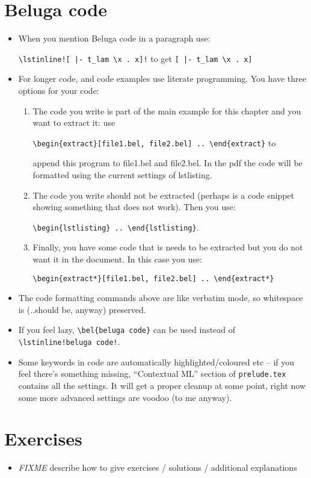 \documentclass[12pt]{article}
\begin{document}
\section{Beluga code}
\begin{itemize}
\item When you mention Beluga code in a paragraph use:

  \verb#\lstinline![ |- t_lam \x . x]!# to get \lstinline![ |- t_lam \x . x]!
\item For longer code, and code examples use literate programming. You have three options for your code:
  \begin{enumerate}
  \item The code you write is part of the main example for this
    chapter and you want to extract it: use

    \verb#\begin{extract}[file1.bel, file2.bel] .. \end{extract}# to

    append this program to file1.bel and file2.bel. In the pdf the
    code will be formatted using the current settings of lstlisting.
  \item The code you write should not be extracted (perhaps is a code
    snippet showing something that does not work). Then you use:

    \verb#\begin{lstlisting} .. \end{lstlisting}#.
  \item Finally, you have some code that is needs to be extracted but
    you do not want it in the document. In this case you use:

    \verb#\begin{extract*}[file1.bel, file2.bel] .. \end{extract*}#
  \end{enumerate}
\item The code formatting commands above are like verbatim mode, so whitespace is (..should be, anyway) preserved.
\item If you feel lazy, \verb#\bel{beluga code}# can be used instead of \\
  \verb#\lstinline!beluga code!#.
\item Some keywords in \beluga code are automatically highlighted/coloured etc -- if you feel there's something missing, ``Contextual ML'' section of \verb#prelude.tex# contains all the settings. It will get a proper cleanup at some point, right now some more advanced settings are voodoo (to me anyway).
\end{itemize}

\section{Exercises}
\begin{itemize}
\item \emph{FIXME} describe how to give exercises / solutions / additional explanations
\end{itemize}
\end{document}
